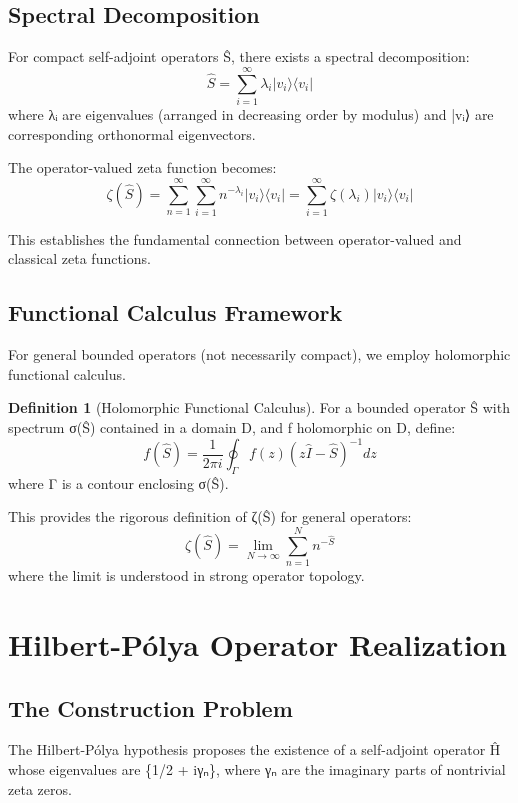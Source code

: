 \documentclass[12pt]{article}
\theoremstyle{plain}
\theoremstyle{definition}
\newtheorem{definition}[theorem]{Definition}
\begin{document}
\subsection{Spectral Decomposition}

For compact self-adjoint operators Ŝ, there exists a spectral decomposition:
$$\hat{S} = \sum_{i=1}^{\infty} \lambda_i |v_i\rangle \langle v_i|$$
where λᵢ are eigenvalues (arranged in decreasing order by modulus) and |vᵢ⟩ are corresponding orthonormal eigenvectors.

The operator-valued zeta function becomes:
$$\zeta(\hat{S}) = \sum_{n=1}^{\infty} \sum_{i=1}^{\infty} n^{-\lambda_i} |v_i\rangle \langle v_i| = \sum_{i=1}^{\infty} \zeta(\lambda_i) |v_i\rangle \langle v_i|$$

This establishes the fundamental connection between operator-valued and classical zeta functions.

\subsection{Functional Calculus Framework}

For general bounded operators (not necessarily compact), we employ holomorphic functional calculus.

\begin{definition}[Holomorphic Functional Calculus]
For a bounded operator Ŝ with spectrum σ(Ŝ) contained in a domain D, and f holomorphic on D, define:
$$f(\hat{S}) = \frac{1}{2\pi i} \oint_{\Gamma} f(z) (z\hat{I} - \hat{S})^{-1} dz$$
where Γ is a contour enclosing σ(Ŝ).
\end{definition}

This provides the rigorous definition of ζ(Ŝ) for general operators:
$$\zeta(\hat{S}) = \lim_{N \to \infty} \sum_{n=1}^{N} n^{-\hat{S}}$$
where the limit is understood in strong operator topology.

\section{Hilbert-Pólya Operator Realization}

\subsection{The Construction Problem}

The Hilbert-Pólya hypothesis proposes the existence of a self-adjoint operator Ĥ whose eigenvalues are \{1/2 + iγₙ\}, where γₙ are the imaginary parts of nontrivial zeta zeros.
\end{document}

